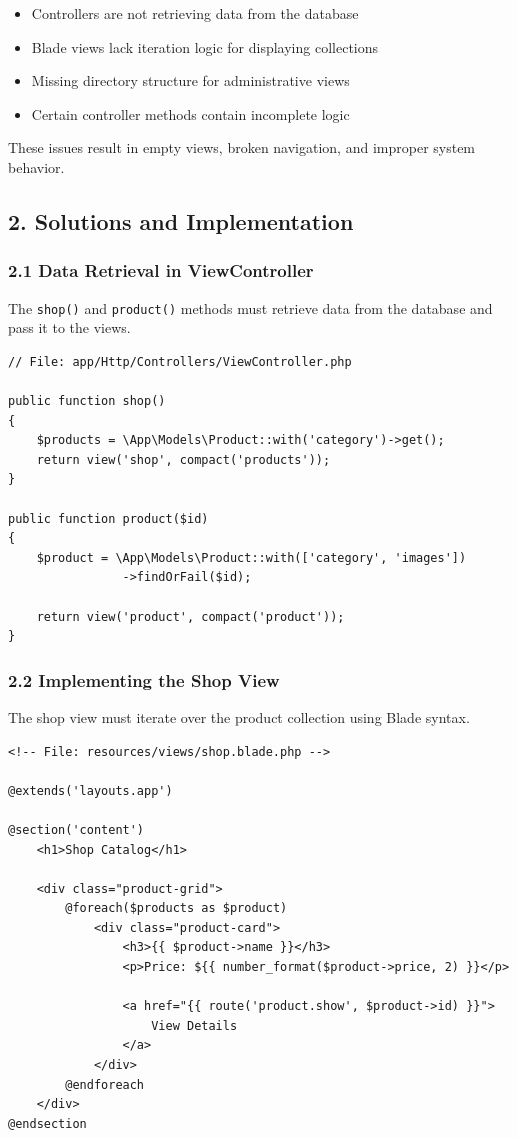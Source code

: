 \documentclass[12pt,a4paper]{article}
\begin{document}
\begin{itemize}[noitemsep]
    \item Controllers are not retrieving data from the database
    \item Blade views lack iteration logic for displaying collections
    \item Missing directory structure for administrative views
    \item Certain controller methods contain incomplete logic
\end{itemize}

These issues result in empty views, broken navigation, and improper system behavior.

\subsection{2. Solutions and Implementation}

\subsubsection{2.1 Data Retrieval in ViewController}

The \texttt{shop()} and \texttt{product()} methods must retrieve data from the database and pass it to the views.

\begin{verbatim}
// File: app/Http/Controllers/ViewController.php

public function shop()
{
    $products = \App\Models\Product::with('category')->get();
    return view('shop', compact('products'));
}

public function product($id)
{
    $product = \App\Models\Product::with(['category', 'images'])
                ->findOrFail($id);

    return view('product', compact('product'));
}
\end{verbatim}

\subsubsection{2.2 Implementing the Shop View}

The shop view must iterate over the product collection using Blade syntax.

\begin{verbatim}
<!-- File: resources/views/shop.blade.php -->

@extends('layouts.app')

@section('content')
    <h1>Shop Catalog</h1>

    <div class="product-grid">
        @foreach($products as $product)
            <div class="product-card">
                <h3>{{ $product->name }}</h3>
                <p>Price: ${{ number_format($product->price, 2) }}</p>

                <a href="{{ route('product.show', $product->id) }}">
                    View Details
                </a>
            </div>
        @endforeach
    </div>
@endsection
\end{verbatim}
\end{document}

